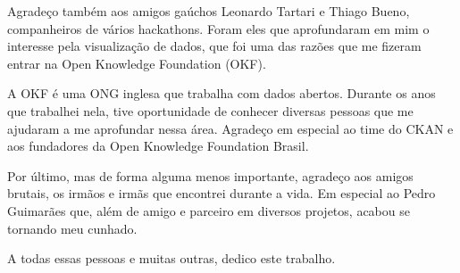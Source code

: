 Agradeço também aos amigos gaúchos Leonardo Tartari e Thiago Bueno,
companheiros de vários hackathons. Foram eles que aprofundaram em mim o
interesse pela visualização de dados, que foi uma das razões que me fizeram
entrar na Open Knowledge Foundation (OKF).

A OKF é uma ONG inglesa que trabalha com dados abertos. Durante os anos que
trabalhei nela, tive oportunidade de conhecer diversas pessoas que me ajudaram
a me aprofundar nessa área. Agradeço em especial ao time do CKAN e aos
fundadores da Open Knowledge Foundation Brasil.

Por último, mas de forma alguma menos importante, agradeço aos amigos brutais,
os irmãos e irmãs que encontrei durante a vida. Em especial ao Pedro Guimarães
que, além de amigo e parceiro em diversos projetos, acabou se tornando meu
cunhado.

A todas essas pessoas e muitas outras, dedico este trabalho.

